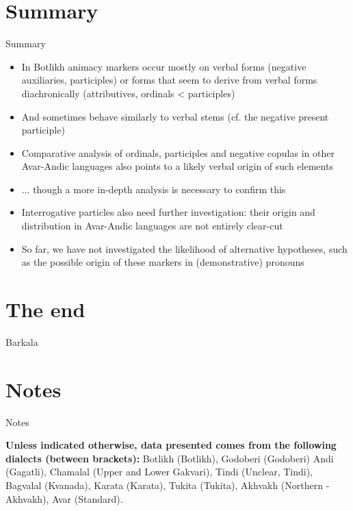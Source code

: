 \section{Summary}
\begin{frame}{Summary}
\begin{itemize}
    \item In Botlikh animacy markers occur mostly on verbal forms (negative auxiliaries, participles) or forms that seem to derive from verbal forms diachronically (attributives, ordinals < participles)
    \item And sometimes behave similarly to verbal stems (cf. the negative present participle)
    \item Comparative analysis of ordinals, participles and negative copulas in other Avar-Andic languages also points to a likely verbal origin of such elements
    \pause
    \item ... though a more in-depth analysis is necessary to confirm this
    \item Interrogative particles also need further investigation: their origin and distribution in Avar-Andic languages are not entirely clear-cut
    \pause
    \item So far, we have not investigated the likelihood of alternative hypotheses, such as the possible origin of these markers in (demonstrative) pronouns
\end{itemize}
\end{frame}

\section{The end}
\begin{frame}{Barkala}
\begin{figure}[h]
\centering
{}
\end{figure}
\end{frame}

\section{Notes}
\begin{frame}{Notes}

\begin{center}
\textbf{Unless indicated otherwise, data presented comes from the following dialects (between brackets):}
Botlikh (Botlikh), Godoberi (Godoberi) Andi (Gagatli), Chamalal (Upper and Lower Gakvari), Tindi (Unclear, Tindi), Bagvalal (Kvanada),  Karata (Karata), Tukita (Tukita), Akhvakh (Northern - Akhvakh), Avar (Standard).
\end{center}
\end{frame}


